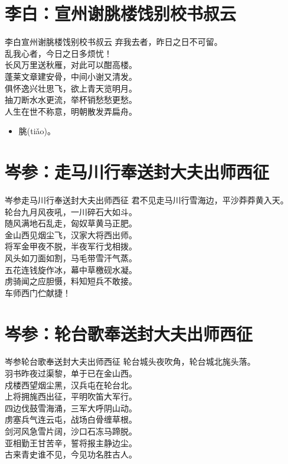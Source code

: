 \documentclass[12pt,oneside,a5paper]{book}
\begin{document}
\chapter{李白：宣州谢朓楼饯别校书叔云}
\begin{poemzh}{李白}{宣州谢朓楼饯别校书叔云}
弃我去者，昨日之日不可留。\\
乱我心者，今日之日多烦忧！\\
长风万里送秋雁，对此可以酣高楼。\\
蓬莱文章建安骨，中间小谢又清发。\\
俱怀逸兴壮思飞，欲上青天览明月。\\
抽刀断水水更流，举杯销愁愁更愁。\\
人生在世不称意，明朝散发弄扁舟。\\ 
\end{poemzh}

\begin{itemize}
\item 朓(tiǎo)。
\end{itemize}


\chapter{岑参：走马川行奉送封大夫出师西征}
\begin{poemzh}{岑参}{走马川行奉送封大夫出师西征}
君不见走马川行雪海边，平沙莽莽黄入天。\\
轮台九月风夜吼，一川碎石大如斗。\\
随风满地石乱走，匈奴草黄马正肥。\\
金山西见烟尘飞，汉家大将西出师。\\
将军金甲夜不脱，半夜军行戈相拨。\\
风头如刀面如割，马毛带雪汗气蒸。\\
五花连钱旋作冰，幕中草檄砚水凝。\\
虏骑闻之应胆慑，料知短兵不敢接。\\
车师西门伫献捷！\\ 
\end{poemzh}

\chapter{岑参：轮台歌奉送封大夫出师西征}
\begin{poemzh}{岑参}{轮台歌奉送封大夫出师西征}
轮台城头夜吹角，轮台城北旄头落。\\
羽书昨夜过渠黎，单于已在金山西。\\
戍楼西望烟尘黑，汉兵屯在轮台北。\\
上将拥旄西出征，平明吹笛大军行。\\
四边伐鼓雪海涌，三军大呼阴山动。\\
虏塞兵气连云屯，战场白骨缠草根。\\
剑河风急雪片阔，沙口石冻马蹄脱。\\
亚相勤王甘苦辛，誓将报主静边尘。\\
古来青史谁不见，今见功名胜古人。\\ 
\end{poemzh}
\end{document}
